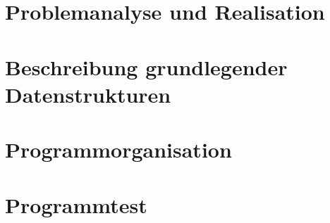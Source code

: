 \documentclass[a4paper,10pt]{scrreprt}
\begin{document}
\section{Problemanalyse und Realisation}
\label{sec:problemanalyse-und-realisation}

\section{Beschreibung grundlegender Datenstrukturen}
\label{sec:beschreibung-grundlegender-datenstrukturen}

\section{Programmorganisation}
\label{sec:programmorganisation}

\section{Programmtest}
\label{sec:programmtest}
\end{document}
